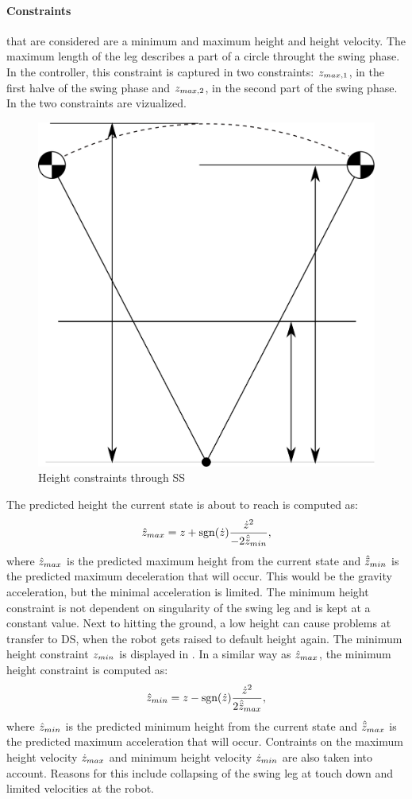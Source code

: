 \paragraph{Constraints} that are considered are a minimum and maximum height and height velocity. The maximum length of the leg describes a part of a circle throught the swing phase. In the controller, this constraint is captured in two constraints: $z_{max,1}$, in the first halve of the swing phase and $z_{max,2}$, in the second part of the swing phase. In  the two constraints are vizualized. 
\begin{figure}[h]
\centering
  \includegraphics[width=.4\linewidth]{STYLESTUFF/heightconstraints.png}
   \caption{Height constraints through \ac{SS}}
    \label{fig:heightconstraints}
\end{figure} 
The predicted height the current state is about to reach is computed as:
\begin{equation}
	\hat{z}_{max} = z + \operatorname{sgn}(\dot{z})\frac{\dot{z}^2}{-2\hat{\ddot{z}}_{min}},
\end{equation}
where $\hat{z}_{max}$ is the predicted maximum height from the current state and $\hat{\ddot{z}}_{min}$ is the predicted maximum deceleration that will occur. This would be the gravity acceleration, but the minimal acceleration is limited. 
\paraskip
The minimum height constraint is not dependent on singularity of the swing leg and is kept at a constant value. Next to hitting the ground, a low height can cause problems at transfer to \ac{DS}, when the robot gets raised to default height again. The minimum height constraint $z_{min}$ is displayed in . In a similar way as $\hat{z}_{max}$, the minimum height constraint is computed as:
\begin{equation}
	\hat{z}_{min} = z - \operatorname{sgn}(\dot{z})\frac{\dot{z}^2}{2\hat{\ddot{z}}_{max}},
\end{equation}
where $\hat{z}_{min}$ is the predicted minimum height from the current state and $\hat{\ddot{z}}_{max}$ is the predicted maximum acceleration that will occur.
\paraskip
Contraints on the maximum height velocity $\dot{z}_{max}$ and minimum height velocity $\dot{z}_{min}$ are also taken into account. Reasons for this include collapsing of the swing leg at touch down and limited velocities at the robot. 


